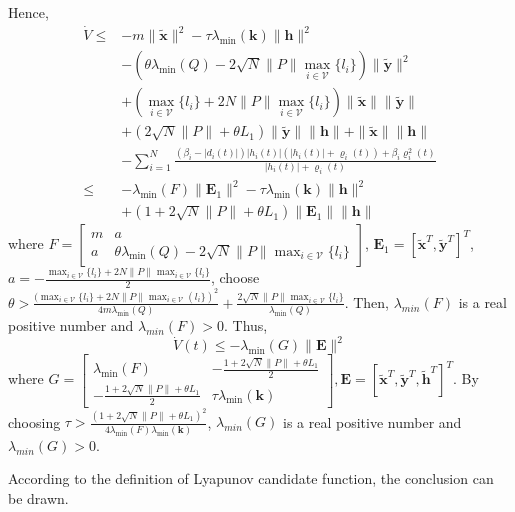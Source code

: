 \documentclass[lettersize,journal]{IEEEtran}
\begin{document}
\begin{IEEEproof}
    Hence,
    \begin{equation}
        \begin{aligned}
            \dot{V}\leq & -m\|\tilde{\mathbf{x}}\|^2-\tau\lambda_{\min}(\mathbf{k})\|\mathbf{h}\|^2                                                    \\
                        & -(\theta\lambda_{\min}(Q)-2\sqrt{N}\|P\|\max_{i\in\mathcal{V}}\{l_i\})\|\tilde{\mathbf{y}}\|^2                               \\
                        & +(\max_{i\in\mathcal{V}}\{l_i\}+2N\|P\|\max_{i\in\mathcal{V}}\{l_i\})\|\tilde{\mathbf{x}}\|\|\tilde{\mathbf{y}}\|            \\
                        & +(2\sqrt{N}\|P\|+\theta L_{1})\|\tilde{\mathbf{y}}\|\|\mathbf{h}\|+\|\tilde{\mathbf{x}}\|\|\mathbf{h}\|                      \\
                        & -\sum_{i = 1}^{N}\frac{(\beta_i - |d_i(t)|)|h_i(t)|(|h_i(t)|+\varrho_i(t)) + \beta_i\varrho_i^2(t)}{|h_i(t)| + \varrho_i(t)} \\
            \leq        & -\lambda_{\min}(F)\|\mathbf{E}_1\|^2-\tau\lambda_{\min}(\mathbf{k})\|\mathbf{h}\|^2                                          \\
                        & +(1+2\sqrt{N}\|P\|+\theta L_1)\|\mathbf{E}_1\|\|\mathbf{h}\|
        \end{aligned}
    \end{equation}
    where $\left.F=\left[\begin{array}{cc}m & a                                                                   \\
             a     & \theta\lambda_{\min}(Q)-2\sqrt{N}\|P\|\max_{i\in\mathcal{V}}\{l_i\}\end{array}\right.\right]$,
    $\mathbf{E}_1 = [\tilde{\mathbf{x}}^T,\tilde{\mathbf{y}}^T]^T$,
    ~~~$a = -\frac{\max_{i\in\mathcal{V}}\{l_{i}\}+2N\|P\|\max_{i\in\mathcal{V}}\{l_{i}\}}{2}$, choose
    $\theta > \frac{(\max_{i\in\mathcal{V}}\{l_{i}\}+2N\|P\|\max_{i\in\mathcal{V}}(l_{i}\})^{2}}{4m\lambda_{\mathrm{min}}(Q)}+\frac{2\sqrt{N}\|P\|\max_{i\in\mathcal{V}}\{l_{i}\}}{\lambda_{\mathrm{min}}(Q)}$. Then, $\lambda_{min}(F)$ is a real positive number and $\lambda_{min}(F) > 0$. Thus,
    \begin{equation}
        \dot{V}(t) \leq -\lambda_{\min}(G)\|\mathbf{E}\|^2
    \end{equation}
    where $\left.G=\left[\begin{array}{cc}\lambda_{\min}(F)&-\frac{1+2\sqrt{N}\|P\|+\theta L_1}2\\-\frac{1+2\sqrt{N}\|P\|+\theta L_1}2&\tau\lambda_{\min}(\mathbf{k})\end{array}\right.\right],
        \mathbf{E} = [\tilde{\mathbf{x}}^T,\tilde{\mathbf{y}}^T,\tilde{\mathbf{h}}^T]^T$. By choosing
    $\tau>\frac{(1+2\sqrt{N}\|P\|+\theta L_{1})^{2}}{4\lambda_{\mathrm{min}}(F)\lambda_{\mathrm{min}}(\mathbf{k})}$, $\lambda_{min}(G)$ is a real positive number and $\lambda_{min}(G) > 0$.

    According to the definition of Lyapunov candidate function, the conclusion can be drawn.
\end{IEEEproof}
\end{document}
